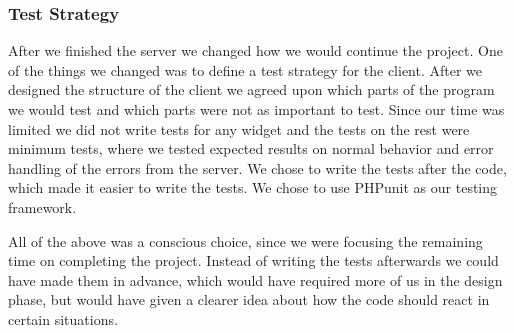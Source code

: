 \subsubsection{Test Strategy}
After we finished the server we changed how we would continue the project.
One of the things we changed was to define a test strategy for the client.
After we designed the structure of the client we agreed upon which parts of the program we would test and which parts were not as important to test.
Since our time was limited we did not write tests for any widget and the tests on the rest were minimum tests, where we tested expected results on normal behavior and error handling of the errors from the server.
We chose to write the tests after the code, which made it easier to write the tests. We chose to use PHPunit as our testing framework.

All of the above was a conscious choice, since we were focusing the remaining time on completing the project.
Instead of writing the tests afterwards we could have made them in advance, which would have required more of us in the design phase, but would have given a clearer idea about how the code should react in certain situations.
